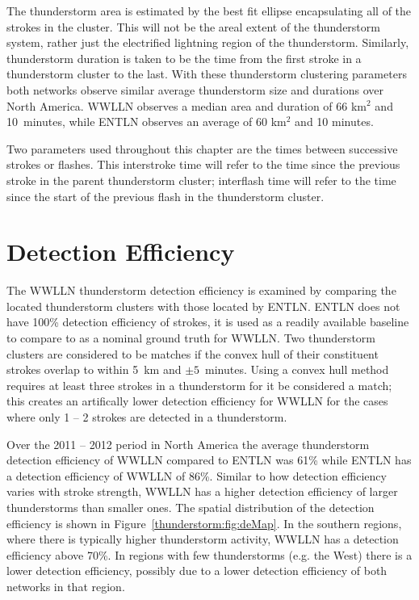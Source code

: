 The thunderstorm area is estimated by the best fit ellipse encapsulating all of the strokes in the cluster.
This will not be the areal extent of the thunderstorm system, rather just the electrified lightning region of the thunderstorm.
Similarly, thunderstorm duration is taken to be the time from the first stroke in a thunderstorm cluster to the last.
With these thunderstorm clustering parameters both networks observe similar average thunderstorm size and durations over North America.
WWLLN observes a median area and duration of 66 km$^2$ and 10~minutes, while ENTLN observes an average of 60 km$^2$ and 10 minutes.

Two parameters used throughout this chapter are the times between successive strokes or flashes.
This interstroke time will refer to the time since the previous stroke in the parent thunderstorm cluster; interflash time will refer to the time since the start of the previous flash in the thunderstorm cluster.

\section{Detection Efficiency}

The WWLLN thunderstorm detection efficiency is examined by comparing the located thunderstorm clusters with those located by ENTLN.
ENTLN does not have 100\% detection efficiency of strokes, it is used as a readily available baseline to compare to as a nominal ground truth for WWLLN.
Two thunderstorm clusters are considered to be matches if the convex hull of their constituent strokes overlap to within 5~km and $\pm5$~minutes.
Using a convex hull method requires at least three strokes in a thunderstorm for it be considered a match; this creates an artifically lower detection efficiency for WWLLN for the cases where only 1 -- 2 strokes are detected in a thunderstorm.

Over the 2011 -- 2012 period in North America the average thunderstorm detection efficiency of WWLLN compared to ENTLN was 61\% while ENTLN has a detection efficiency of WWLLN of 86\%.
Similar to how detection efficiency varies with stroke strength, WWLLN has a higher detection efficiency of larger thunderstorms than smaller ones.
The spatial distribution of the detection efficiency is shown in Figure~\ref{thunderstorm:fig:deMap}.
In the southern regions, where there is typically higher thunderstorm activity, WWLLN has a detection efficiency above 70\%.
In regions with few thunderstorms (e.g. the West) there is a lower detection efficiency, possibly due to a lower detection efficiency of both networks in that region.

